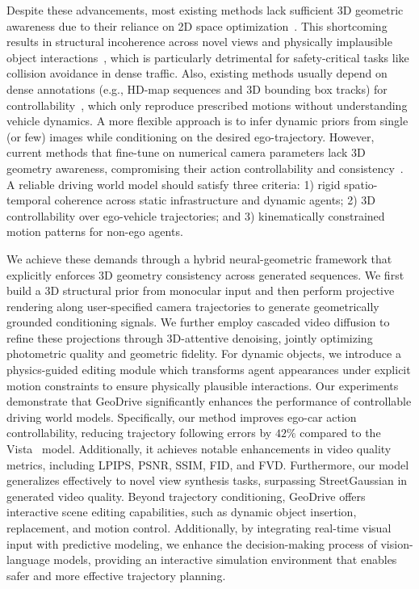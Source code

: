 \documentclass{article}
\begin{document}
Despite these advancements, most existing methods lack sufficient 3D geometric awareness due to their reliance on 2D space optimization~\cite{gao2024vista}. 
This shortcoming results in structural incoherence across novel views and physically implausible object interactions~\cite{yang2024generalized, wang2023drivedreamer}, which is particularly detrimental for safety-critical tasks like collision avoidance in dense traffic. 
Also, existing methods usually depend on dense annotations (e.g., HD-map sequences and 3D bounding box tracks) for controllability~\cite{wang2023drivedreamer, li2023drivingdiffusion}, which only reproduce prescribed motions without understanding vehicle dynamics. 
A more flexible approach is to infer dynamic priors from single (or few) images while conditioning on the desired ego-trajectory. However, current methods that fine-tune on numerical camera parameters lack 3D geometry awareness, compromising their action controllability and consistency~\cite{gao2024vista, arai2024actbench, gaia1-2023}.
A reliable driving world model should satisfy three criteria: 1) rigid spatio-temporal coherence across static infrastructure and dynamic agents; 2) 3D controllability over ego-vehicle trajectories; and 3) kinematically constrained motion patterns for non-ego agents.

We achieve these demands through a hybrid neural-geometric framework that explicitly enforces 3D geometry consistency across generated sequences.
We first build a 3D structural prior from monocular input and then perform projective rendering along user-specified camera trajectories to generate geometrically grounded conditioning signals. 
We further employ cascaded video diffusion to refine these projections through 3D-attentive denoising, jointly optimizing photometric quality and geometric fidelity. 
For dynamic objects, we introduce a physics-guided editing module which transforms agent appearances under explicit motion constraints to ensure physically plausible interactions.
Our experiments demonstrate that GeoDrive significantly enhances the performance of controllable driving world models. 
Specifically, our method improves ego-car action controllability, reducing trajectory following errors by $42\%$ compared to the Vista~\cite{gao2024vista} model. 
Additionally, it achieves notable enhancements in video quality metrics, including LPIPS, PSNR, SSIM, FID, and FVD. Furthermore, our model generalizes effectively to novel view synthesis tasks, surpassing StreetGaussian in generated video quality. 
Beyond trajectory conditioning, GeoDrive offers interactive scene editing capabilities, such as dynamic object insertion, replacement, and motion control. Additionally, by integrating real-time visual input with predictive modeling, we enhance the decision-making process of vision-language models, providing an interactive simulation environment that enables safer and more effective trajectory planning.
\end{document}

